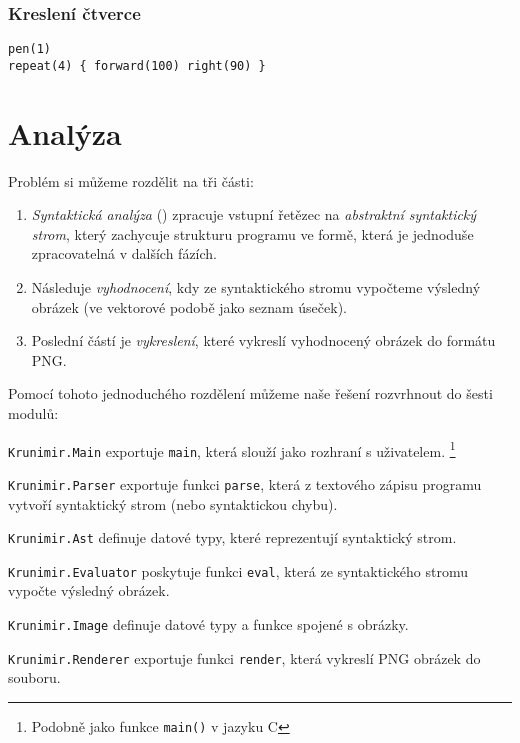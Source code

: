 \subsubsection{Kreslení čtverce}

\begin{verbatim}
pen(1)
repeat(4) { forward(100) right(90) }
\end{verbatim}


\section{Analýza}

Problém si můžeme rozdělit na tři části:

\begin{enumerate}

\item \emph{Syntaktická analýza} () zpracuje vstupní řetězec na
  \emph{abstraktní syntaktický strom}, který zachycuje strukturu programu ve
  formě, která je jednoduše zpracovatelná v dalších fázích.

\item Následuje \emph{vyhodnocení}, kdy ze syntaktického stromu vypočteme
  výsledný obrázek (ve vektorové podobě jako seznam úseček).

\item Poslední částí je \emph{vykreslení}, které vykreslí vyhodnocený obrázek do
  formátu PNG.

\end{enumerate}

Pomocí tohoto jednoduchého rozdělení můžeme naše řešení rozvrhnout do šesti
modulů:

\begin{description}

\item \texttt{Krunimir.Main} exportuje \texttt{main}, která slouží jako rozhraní s
uživatelem. \footnote{Podobně jako funkce \texttt{main()} v jazyku C}

\item \texttt{Krunimir.Parser} exportuje funkci \texttt{parse}, která z textového
zápisu programu vytvoří syntaktický strom (nebo syntaktickou chybu).

\item \texttt{Krunimir.Ast} definuje datové typy, které reprezentují syntaktický
strom.

\item \texttt{Krunimir.Evaluator} poskytuje funkci \texttt{eval}, která ze
syntaktického stromu vypočte výsledný obrázek.

\item \texttt{Krunimir.Image} definuje datové typy a funkce spojené s obrázky.

\item \texttt{Krunimir.Renderer} exportuje funkci \texttt{render}, která vykreslí PNG
obrázek do souboru.

\end{description}




